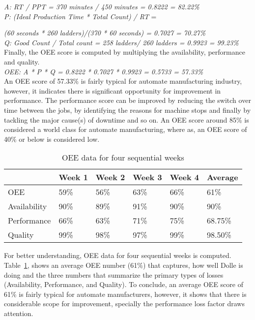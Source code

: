 \documentclass[runningheads]{llncs}
\begin{document}
\emph{A: RT / PPT = 370 minutes / 450 minutes = 0.8222 = 82.22\%}\\

\emph{P: (Ideal Production Time * Total Count) / RT} = 

\hspace{12mm} \emph{(60 seconds * 260 ladders)/(370 * 60 seconds) = 0.7027 = 70.27\%}\\

\emph{Q: Good Count / Total count = 258 ladders/ 260 ladders = 0.9923 = 99.23\%}\\

Finally, the OEE score is computed by multiplying the availability, performance and quality.\\ 

\emph{OEE: A * P * Q = 0.8222 * 0.7027 * 0.9923 = 0.5733 = 57.33\%}\\

An OEE score of 57.33\% is fairly typical for automate manufacturing industry, however, it indicates there is significant opportunity for improvement in performance. The performance score can be improved by reducing the switch over time between the jobs, by identifying the reasons for machine stops and finally by tackling the major cause(s) of downtime and so on. An OEE score around 85\% is considered a world class for automate manufacturing, where as, an OEE score of 40\% or below is considered low.

\begin{table}[]
\label{tab:distance}
\centering
\caption{OEE data for four sequential weeks}
\begin{tabular}{p{2.4cm}p{1.6cm}p{1.6cm}p{1.6cm}p{1.6cm}p{1.6cm}}
\hline
\multicolumn{1}{l}{\textbf{}} &  \textbf{Week 1} & \textbf{Week 2} & \textbf{Week 3}& \textbf{Week 4} & \textbf{Average} \\ \hline
OEE             & 59\%& 56\% &  63\% & 66\% & 61\%\\
Availability             & 90\%& 89\% &  91\% & 90\% & 90\%\\
Performance            & 66\%& 63\% &  71\% & 75\% & 68.75\% \\
Quality             & 99\%& 98\% &  97\% & 99\% & 98.50\%\\
\hline
\end{tabular}
\label{tab:dist}
\end{table}

 For better understanding, OEE data for four sequential weeks is computed. Table~\ref{tab:dist}, shows an average OEE number (61\%) that captures, how well Dolle is doing and the three numbers that summarize the primary types of losses (Availability, Performance, and Quality). To conclude, an average OEE score of 61\% is fairly typical for automate manufacturers, however, it shows that there is considerable scope for improvement, specially the performance loss factor draws attention.
\end{document}
